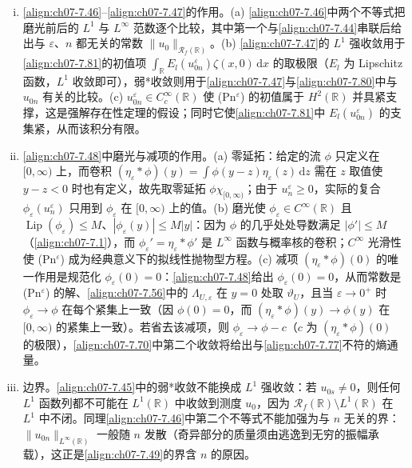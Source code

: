 ﻿\documentclass[../../main.tex]{subfiles}%
\begin{document}
\begin{remark}
\begin{enumerate}[(i)]
\item \eqref{align:ch07-7.46}--\eqref{align:ch07-7.47}的作用。(a) \eqref{align:ch07-7.46}中两个不等式把磨光前后的 $L^1$ 与 $L^\infty$ 范数逐个比较，其中第一个与\eqref{align:ch07-7.44}串联后给出与 $\varepsilon$、$n$ 都无关的常数 $\|u_0\|_{\mathscr{R}_f(\mathbb{R})}$。(b) \eqref{align:ch07-7.47}的 $L^1$ 强收敛用于\eqref{align:ch07-7.81}的初值项 $\int_{\mathbb{R}}E_l(u_{0n}^\varepsilon)\zeta(x,0)\,\mathrm{d}x$ 的取极限（$E_l$ 为 Lipschitz 函数，$L^1$ 收敛即可），弱*收敛则用于\eqref{align:ch07-7.47}与\eqref{align:ch07-7.80}中与 $u_{0n}$ 有关的比较。(c) $u_{0n}^\varepsilon\in C^\infty_c(\mathbb{R})$ 使 (Pn$^\varepsilon$) 的初值属于 $H^2(\mathbb{R})$ 并具紧支撑，这是强解存在性定理的假设；同时它使\eqref{align:ch07-7.81}中 $E_l(u_{0n}^\varepsilon)$ 的支集紧，从而该积分有限。
\item \eqref{align:ch07-7.48}中磨光与减项的作用。(a) 零延拓：给定的流 $\phi$ 只定义在 $[0,\infty)$ 上，而卷积 $(\eta_\varepsilon*\phi)(y)=\int\phi(y-z)\eta_\varepsilon(z)\,\mathrm{d}z$ 需在 $z$ 取值使 $y-z<0$ 时也有定义，故先取零延拓 $\phi\chi_{[0,\infty)}$；由于 $u_n^\varepsilon\geqslant0$，实际的复合 $\phi_\varepsilon(u_n^\varepsilon)$ 只用到 $\phi_\varepsilon$ 在 $[0,\infty)$ 上的值。(b) 磨光使 $\phi_\varepsilon\in C^\infty(\mathbb{R})$ 且 $\operatorname{Lip}(\phi_\varepsilon)\leqslant M$、$|\phi_\varepsilon(y)|\leqslant M|y|$：因为 $\phi$ 的几乎处处导数满足 $|\phi'|\leqslant M$（\eqref{align:ch07-7.1}），而 $\phi_\varepsilon'=\eta_\varepsilon*\phi'$ 是 $L^\infty$ 函数与概率核的卷积；$C^\infty$ 光滑性使 (Pn$^\varepsilon$) 成为经典意义下的拟线性抛物型方程。(c) 减项 $(\eta_\varepsilon*\phi)(0)$ 的唯一作用是规范化 $\phi_\varepsilon(0)=0$：\eqref{align:ch07-7.48}给出 $\phi_\varepsilon(0)=0$，从而常数是 (Pn$^\varepsilon$) 的解、\eqref{align:ch07-7.56}中的 $\Lambda_{U,\varepsilon}$ 在 $y=0$ 处取 $\vartheta_U$，且当 $\varepsilon\to0^+$ 时 $\phi_\varepsilon\to\phi$ 在每个紧集上一致（因 $\phi(0)=0$，而 $(\eta_\varepsilon*\phi)(y)\to\phi(y)$ 在 $[0,\infty)$ 的紧集上一致）。若省去该减项，则 $\phi_\varepsilon\to\phi-c$（$c$ 为 $(\eta_\varepsilon*\phi)(0)$ 的极限），\eqref{align:ch07-7.70}中第二个收敛将给出与\eqref{align:ch07-7.77}不符的熵通量。
\item 边界。\eqref{align:ch07-7.45}中的弱*收敛不能换成 $L^1$ 强收敛：若 $u_{0s}\neq0$，则任何 $L^1$ 函数列都不可能在 $L^1(\mathbb{R})$ 中收敛到测度 $u_0$，因为 $\mathscr{R}_f(\mathbb{R})\setminus L^1(\mathbb{R})$ 在 $L^1$ 中不闭。同理\eqref{align:ch07-7.46}中第二个不等式不能加强为与 $n$ 无关的界：$\|u_{0n}\|_{L^\infty(\mathbb{R})}$ 一般随 $n$ 发散（奇异部分的质量须由逃逸到无穷的振幅承载），这正是\eqref{align:ch07-7.49}的界含 $n$ 的原因。
\end{enumerate}
\end{remark}
\end{document}
